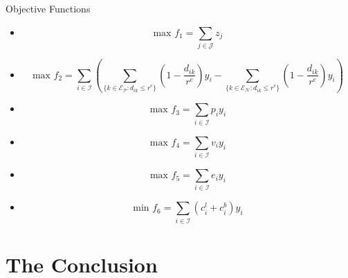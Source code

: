 \documentclass[10pt, compress]{beamer}
\begin{document}
\begin{frame}{Objective Functions}
\begin{itemize}[<+- | alert@+>]
\item[] \begin{equation*}
\textrm{max } f_1 = \sum_{j \in \mathcal{J}} z_j
\end{equation*}
\item[] \begin{equation*}
\textrm{max } f_2 = \sum_{i \in \mathcal{I}}  \left( \sum_{\{k \in \mathcal{E_P}: d_{ik} \leq r^e  \}} \left( 1-\frac{d_{ik}}{r^e} \right) y_i  -   \sum_{\{k \in \mathcal{E_N}: d_{ik} \leq r^e  \}} \left( 1-\frac{d_{ik}}{r^e} \right) y_i   \right)
\end{equation*}
\item[] \begin{equation*}
\textrm{max } f_3 = \sum_{i \in \mathcal{I}} p_iy_i
\end{equation*}
\item[] \begin{equation*}
\textrm{max } f_4 = \sum_{i \in \mathcal{I}} v_iy_i
\end{equation*}
\item[] \begin{equation*}
\textrm{max } f_5 = \sum_{i \in \mathcal{I}} e_iy_i
\end{equation*}
\item[] \begin{equation*}
\textrm{min } f_6 = \sum_{i \in \mathcal{I}} (c_i^l + c_i^b)y_i
\end{equation*}
\end{itemize}
\end{frame}



\section{The Conclusion}
\end{document}
